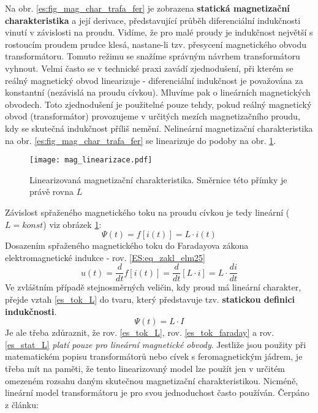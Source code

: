    Na obr. \ref{es:fig_mag_char_trafa_fer} je zobrazena \textbf{statická magnetizační 
    charakteristika} a její derivace, představující průběh diferenciální indukčnosti vinutí v 
    závislosti na proudu. Vidíme, že pro malé proudy je indukčnost největší s rostoucím proudem 
    prudce klesá, nastane-li tzv. přesycení magnetického obvodu transformátoru. Tomuto režimu se 
    snažíme správným návrhem transformátoru vyhnout. Velmi často se v technické praxi zavádí 
    zjednodušení, při kterém se reálný magnetický obvod linearizuje - diferenciální indukčnost je 
    považována za konstantní (nezávislá na proudu cívkou). Mluvíme pak o lineárních magnetických 
    obvodech. Toto zjednodušení je použitelné pouze tehdy, pokud reálný magnetický obvod 
    (transformátor) provozujeme v určitých mezích magnetizačního proudu, kdy se skutečná indukčnost
    příliš nemění. Nelineární magnetizační charakteristika na obr. \ref{es:fig_mag_char_trafa_fer} 
    se linearizuje do podoby na obr. \ref{figure:mag_lin}.

    \begin{figure}[ht!]   %
      \centering
      \texttt{[image: mag\_linearizace.pdf]}
      \caption{Linearizovaná magnetizační charakteristika. Směrnice této přímky je právě rovna $L$}
      \label{figure:mag_lin}
    \end{figure}
    Závislost spřaženého magnetického toku na proudu cívkou je tedy lineární ($L=konst$) viz obrázek
    \ref{figure:mag_lin}:
    \begin{equation}\label{es_tok_L}
      \Psi(t)=f[i(t)] = L \cdot i(t)
    \end{equation}    
    Dosazením spřaženého magnetického toku do Faradayova zákona elektromagnetické indukce - rov.
    \ref{ES:eq_zakl_elm25}
    \begin{equation}\label{es_tok_faraday}
        u(t)=\frac{d}{dt}f[i(t)]=\frac{d}{dt}[L\cdot i]=L\cdot\frac{di}{dt}
    \end{equation}
    Ve zvláštním případě stejnosměrných veličin, kdy proud má lineární charakter, přejde vztah
    \ref{es_tok_L} do tvaru, který představuje tzv. \textbf{statickou definici indukčnosti}.
    \begin{equation}\label{es_stat_L}
      \Psi(t)= L \cdot I
    \end{equation}
    Je ale třeba zdůraznit, že rov. \ref{es_tok_L}, rov. \ref{es_tok_faraday} a rov. 
    \ref{es_stat_L} \emph{platí pouze pro lineární magnetické obvody}. Jestliže jsou použity při 
    matematickém popisu transformátorů nebo cívek s feromagnetickým jádrem, je třeba mít na paměti, 
    že tento linearizovaný model lze použít jen v určitém omezeném rozsahu daným skutečnou 
    magnetizační charakteristikou. Nicméně, lineární model transformátoru je pro svou jednoduchost 
    často používán. Čerpáno z článku: \librarianTrafoModel
    
